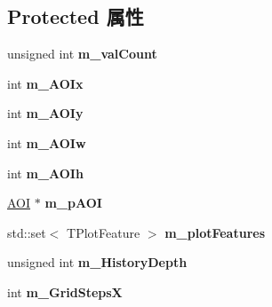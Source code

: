 \subsection*{Protected 属性}
\begin{DoxyCompactItemize}
\item 
\hypertarget{class_plot_canvas_image_analysis_a0080ec3b145fa76332c1afa62efcfccf}{unsigned int {\bfseries m\+\_\+val\+Count}}\label{class_plot_canvas_image_analysis_a0080ec3b145fa76332c1afa62efcfccf}

\item 
\hypertarget{class_plot_canvas_image_analysis_adf75b850510714342fc3ce6e43dac212}{int {\bfseries m\+\_\+\+A\+O\+Ix}}\label{class_plot_canvas_image_analysis_adf75b850510714342fc3ce6e43dac212}

\item 
\hypertarget{class_plot_canvas_image_analysis_a51ae0cd4d1325b5693da297fec1fee2a}{int {\bfseries m\+\_\+\+A\+O\+Iy}}\label{class_plot_canvas_image_analysis_a51ae0cd4d1325b5693da297fec1fee2a}

\item 
\hypertarget{class_plot_canvas_image_analysis_aa831745594a9d46f6ca6ab2de8d425fe}{int {\bfseries m\+\_\+\+A\+O\+Iw}}\label{class_plot_canvas_image_analysis_aa831745594a9d46f6ca6ab2de8d425fe}

\item 
\hypertarget{class_plot_canvas_image_analysis_a9f85fd17437e056045dff4c0ec4652c8}{int {\bfseries m\+\_\+\+A\+O\+Ih}}\label{class_plot_canvas_image_analysis_a9f85fd17437e056045dff4c0ec4652c8}

\item 
\hypertarget{class_plot_canvas_image_analysis_a67058a96926d4a8a8b3dc1caaadbbfc2}{\hyperlink{struct_a_o_i}{A\+O\+I} $\ast$ {\bfseries m\+\_\+p\+A\+O\+I}}\label{class_plot_canvas_image_analysis_a67058a96926d4a8a8b3dc1caaadbbfc2}

\item 
\hypertarget{class_plot_canvas_image_analysis_a620811cf70e525914e14ca76ef597189}{std\+::set$<$ T\+Plot\+Feature $>$ {\bfseries m\+\_\+plot\+Features}}\label{class_plot_canvas_image_analysis_a620811cf70e525914e14ca76ef597189}

\item 
\hypertarget{class_plot_canvas_image_analysis_ac6facc560fce2e48c9f5fa8fa0bebad9}{unsigned int {\bfseries m\+\_\+\+History\+Depth}}\label{class_plot_canvas_image_analysis_ac6facc560fce2e48c9f5fa8fa0bebad9}

\item 
\hypertarget{class_plot_canvas_image_analysis_a32c9f90a99c056f03518841afd997075}{int {\bfseries m\+\_\+\+Grid\+Steps\+X}}\label{class_plot_canvas_image_analysis_a32c9f90a99c056f03518841afd997075}


\end{DoxyCompactItemize}
